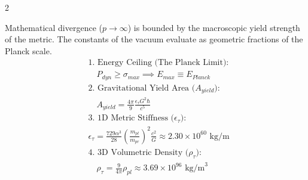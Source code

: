 \documentclass[11pt, a4paper]{article}
\newcounter{cheatnum}
\begin{document}
\begin{multicols}{2}
\begin{tcolorbox}[cheatbox, title={\refstepcounter{cheatnum}\label{box:continuum_constants}\thecheatnum. Continuum Constants (UV Regularization) \scriptsize\hfill\hyperref[sec:deriv_continuum_constants]{[Proof $\downarrow$]}}]
Mathematical divergence ($p \to \infty$) is bounded by the macroscopic yield strength of the metric. The constants of the vacuum evaluate as geometric fractions of the Planck scale.
\begin{align}
    &\text{1. Energy Ceiling (The Planck Limit):} \nonumber \\
    &\quad P_{dyn} \ge \sigma_{max} \implies E_{max} \equiv E_{Planck} \label{eq:planck_ceiling} \\
    &\text{2. Gravitational Yield Area ($A_{yield}$):} \nonumber \\
    &\quad A_{yield} = \frac{4\pi}{9} \frac{\epsilon_{\tau} G^2 \hbar}{c^5} \label{eq:gravitational_yield} \\
    &\text{3. 1D Metric Stiffness ($\epsilon_{\tau}$):} \nonumber \\
    &\epsilon_{\tau} = \frac{729 \alpha^3}{28} \left( \frac{m_{pl}}{m_{pr}} \right)^2 \frac{c^2}{G} \approx 2.30 \times 10^{60} \text{ kg/m} \label{eq:epsilon_numerical} \\
    &\text{4. 3D Volumetric Density ($\rho_{\tau}$):} \nonumber \\
    &\quad \rho_{\tau} = \frac{9}{4\pi} \rho_{pl} \approx 3.69 \times 10^{96} \text{ kg/m}^3 \label{eq:rho_tau_numerical}
\end{align}
\end{tcolorbox}


\end{multicols}
\end{document}
